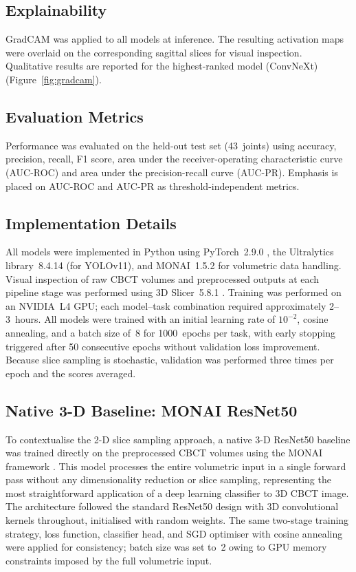 \documentclass[review,12pt]{elsarticle}
\begin{document}
\subsection{Explainability}
\label{sec:xai}

GradCAM \cite{Selvaraju_2019} was applied to all models at inference.
The resulting activation maps were overlaid on the corresponding
sagittal slices for visual inspection.
Qualitative results are reported for the highest-ranked model
(ConvNeXt) (Figure~\ref{fig:gradcam}).

\subsection{Evaluation Metrics}
\label{sec:metrics}

Performance was evaluated on the held-out test set (43~joints) using
accuracy, precision, recall, F1 score, area under the
receiver-operating characteristic curve (AUC-ROC) and area under the precision-recall curve (AUC-PR). Emphasis is placed
on AUC-ROC and AUC-PR as threshold-independent metrics.

\subsection{Implementation Details}
\label{sec:impl}

All models were implemented in Python using PyTorch~2.9.0
\cite{paszke2019pytorch}, the Ultralytics library~8.4.14
\cite{yolo11_ultralytics} (for YOLOv11), and MONAI~1.5.2
\cite{monai2026} for volumetric data handling. 
Visual inspection of raw CBCT volumes and preprocessed outputs at each pipeline stage was performed using 3D Slicer~5.8.1 \cite{fedorov20123d}.
Training was performed on
an NVIDIA~L4 GPU; each model--task combination required approximately
2--3~hours. All models were trained with an initial learning rate of
$10^{-2}$, cosine annealing, and a batch size of~8 for 1000~epochs per
task, with early stopping triggered after 50 consecutive epochs without
validation loss improvement. Because slice sampling is stochastic,
validation was performed three times per epoch and the scores averaged.

\subsection{Native 3-D Baseline: MONAI ResNet50}
\label{sec:monai3d}

To contextualise the 2-D slice sampling approach, a native 3-D ResNet50
baseline was trained directly on the preprocessed CBCT volumes using the MONAI framework \cite{monai2026}. This model processes the entire volumetric input in a single forward pass without
any dimensionality reduction or slice sampling, representing the most
straightforward application of a deep learning classifier to 3D CBCT image. The architecture followed the standard ResNet50 design with 3D
convolutional kernels throughout, initialised with random weights. The same
two-stage training strategy, loss function, classifier head, and
SGD optimiser with cosine annealing were applied for consistency;
batch size was set to~2 owing to GPU memory constraints imposed by the
full volumetric input.
\end{document}
